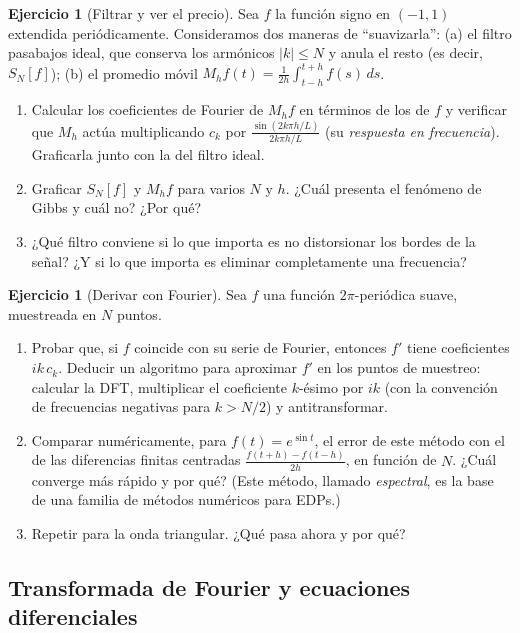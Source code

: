 \documentclass[12pt, a4paper]{amsbook}
\theoremstyle{remark}
\theoremstyle{definition}
\newtheorem{ejer}[teo]{Ejercicio}
\numberwithin{section}{chapter}
\numberwithin{subsection}{section}
\numberwithin{equation}{section}
\numberwithin{figure}{chapter}
\begin{document}
\begin{ejer}[Filtrar y ver el precio]
Sea $f$ la función signo en $(-1,1)$ extendida periódicamente. Consideramos dos maneras de ``suavizarla'': (a) el filtro pasabajos ideal, que conserva los armónicos $|k|\le N$ y anula el resto (es decir, $S_N[f]$); (b) el promedio móvil $M_hf(t) = \frac{1}{2h}\int_{t-h}^{t+h}f(s)\,ds$.
\begin{enumerate}
\item Calcular los coeficientes de Fourier de $M_hf$ en términos de los de $f$ y verificar que $M_h$ actúa multiplicando $c_k$ por $\frac{\sin(2k\pi h/L)}{2k\pi h/L}$ (su \emph{respuesta en frecuencia}). Graficarla junto con la del filtro ideal.
\item Graficar $S_N[f]$ y $M_hf$ para varios $N$ y $h$. ¿Cuál presenta el fenómeno de Gibbs y cuál no? ¿Por qué?
\item ¿Qué filtro conviene si lo que importa es no distorsionar los bordes de la señal? ¿Y si lo que importa es eliminar completamente una frecuencia?
\end{enumerate}
\end{ejer}

\begin{ejer}[Derivar con Fourier]
Sea $f$ una función $2\pi$-periódica suave, muestreada en $N$ puntos.
\begin{enumerate}
\item Probar que, si $f$ coincide con su serie de Fourier, entonces $f'$ tiene coeficientes $ik\,c_k$. Deducir un algoritmo para aproximar $f'$ en los puntos de muestreo: calcular la DFT, multiplicar el coeficiente $k$-ésimo por $ik$ (con la convención de frecuencias negativas para $k>N/2$) y antitransformar.
\item Comparar numéricamente, para $f(t) = e^{\sin t}$, el error de este método con el de las diferencias finitas centradas $\frac{f(t+h)-f(t-h)}{2h}$, en función de $N$. ¿Cuál converge más rápido y por qué? (Este método, llamado \emph{espectral}, es la base de una familia de métodos numéricos para EDPs.)
\item Repetir para la onda triangular. ¿Qué pasa ahora y por qué?
\end{enumerate}
\end{ejer}

\subsection*{Transformada de Fourier y ecuaciones diferenciales}
\end{document}

